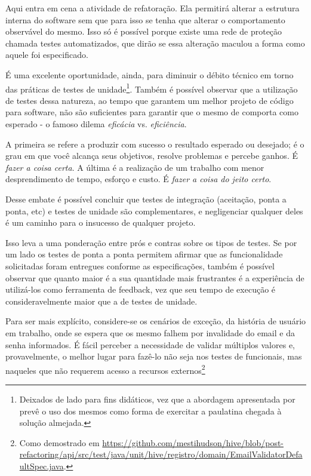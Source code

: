   Aqui entra em cena a atividade de refatoração. Ela permitirá alterar a estrutura interna do software sem que para isso se tenha que alterar o comportamento observável do mesmo. Isso só é possível porque existe uma rede de proteção chamada testes automatizados, que dirão se essa alteração maculou a forma como aquele foi especificado.

  É uma excelente oportunidade, ainda, para diminuir o débito técnico em torno das práticas de testes de unidade\footnote{Deixados de lado para fins didáticos, vez que a abordagem apresentada por  prevê o uso dos mesmos como forma de exercitar a paulatina chegada à solução almejada.}. Também é possível observar que a utilização de testes dessa natureza, ao tempo que garantem um melhor projeto de código para software, não são suficientes para garantir que o mesmo de comporta como esperado - o famoso dilema \emph{eficácia} vs. \emph{eficiência}.

  A primeira se refere a produzir com sucesso o resultado esperado ou desejado; é o grau em que você alcança seus objetivos, resolve problemas e percebe ganhos. É \emph{fazer a coisa certa}.
      A última é a realização de um trabalho com menor desprendimento de tempo, esforço e custo. É \emph{fazer a coisa do jeito certo}.\cite[p.2, tradução nossa]{Stack2016}

  Desse embate é possível concluir que testes de integração (aceitação, ponta a ponta, etc) e testes de unidade são complementares, e negligenciar qualquer deles é um caminho para o insucesso de qualquer projeto.

  Isso leva a uma ponderação entre prós e contras sobre os tipos de testes. Se por um lado os testes de ponta a ponta permitem afirmar que as funcionalidade solicitadas foram entregues conforme as especificações, também é possível observar que quanto maior é a sua quantidade mais frustrantes é a experiência de utilizá-los como ferramenta de feedback, vez que seu tempo de execução é consideravelmente maior que a de testes de unidade.

  Para ser mais explícito, considere-se os cenários de exceção, da história de usuário em trabalho, onde se espera que os mesmo falhem por invalidade do email e da senha informados. É fácil perceber a necessidade de validar múltiplos valores e, provavelmente, o melhor lugar para fazê-lo não seja nos testes de funcionais, mas naqueles que não requerem acesso a recursos externos\footnote{Como demostrado em \url{https://github.com/mestihudson/hive/blob/post-refactoring/api/src/test/java/unit/hive/registro/domain/EmailValidatorDefaultSpec.java}.}

